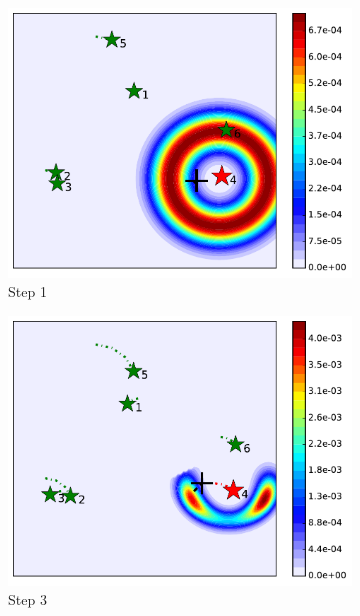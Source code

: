 \documentclass[journal]{IEEEtranTIE}
\theoremstyle{remark}
\begin{document}
\begin{figure}%
	\centering
	\begin{subfigure}[b]{0.23\textwidth}
		\includegraphics[width=\textwidth]{figures/hetero_mov_sen_mov_tar_rbt4_step1}
		\caption{Step 1}\label{fig:htr_mov_sen_mov_tar_sing1}
	\end{subfigure}
	\begin{subfigure}[b]{0.23\textwidth}
		\includegraphics[width=\textwidth]{figures/hetero_mov_sen_mov_tar_rbt4_step3}
		\caption{Step 3}\label{fig:htr_mov_sen_mov_tar_sing2}
	\end{subfigure}
	\begin{subfigure}[b]{0.23\textwidth}

\end{subfigure}
\end{figure}
\end{document}
